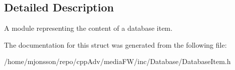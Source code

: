 \subsection{Detailed Description}
A module representing the content of a database item. 



The documentation for this struct was generated from the following file\+:\begin{DoxyCompactItemize}
\item 
/home/mjonsson/repo/cpp\+Adv/media\+F\+W/inc/\+Database/Database\+Item.\+h\end{DoxyCompactItemize}
